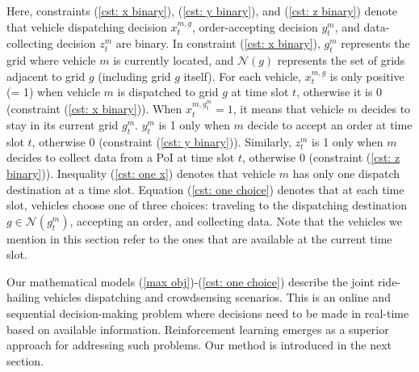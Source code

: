 Here, constraints (\ref{cst: x binary}), (\ref{cst: y binary}), and (\ref{cst: z binary}) denote that vehicle dispatching decision $x_t^{m,g}$, order-accepting decision $y_t^{m}$, and data-collecting decision $z_t^m$ are binary. In constraint (\ref{cst: x binary}), $g_t^m$ represents the grid where vehicle $m$ is currently located, and $\mathcal{N}(g)$ represents the set of grids adjacent to grid $g$ (including grid $g$ itself). For each vehicle, $x_t^{m,g}$ is only positive (= 1) when vehicle $m$ is dispatched to grid $g$ at time slot $t$, otherwise it is 0 (constraint (\ref{cst: x binary})). When $x_t^{m,g_t^m} = 1$, it means that vehicle $m$ decides to stay in its current grid $g_t^m$. $y_t^{m}$ is 1 only when $m$ decide to accept an order at time slot $t$, otherwise 0 (constraint (\ref{cst: y binary})). Similarly, $z_t^{m}$ is 1 only when $m$ decides to collect data from a PoI at time slot $t$, otherwise 0 (constraint (\ref{cst: z binary})).
Inequality (\ref{cst: one x}) denotes that vehicle $m$ has only one dispatch destination at a time slot. Equation (\ref{cst: one choice}) denotes that at each time slot, vehicles choose one of three choices: traveling to the dispatching destination $g \in \mathcal{N}(g_t^m)$, accepting an order, and collecting data. Note that the vehicles we mention in this section refer to the ones that are available at the current time slot.

Our mathematical models (\ref{max obj})-(\ref{cst: one choice}) describe the joint ride-hailing vehicles dispatching and crowdsensing scenarios. This is an online and sequential decision-making problem where decisions need to be made in real-time based on available information. Reinforcement learning emerges as a superior approach for addressing such problems. Our method is introduced in the next section.





 